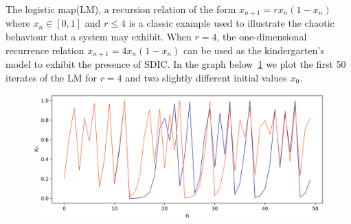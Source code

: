 \begin{Example} \rm
  The logistic map(LM), a recursion relation of the form $x_{n+1}=rx_n(1-x_n)$ where $x_n\in[0,1]$ and $r\leq{4}$ is a classic example used to illustrate the chaotic behaviour that a system may exhibit. When $r=4$, the one-dimensional recurrence relation $x_{n+1}=4x_n(1-x_n)$ can be used as the kindergarten's model to exhibit the presence of SDIC. 
  In the graph below~\ref{fig:log_sdic} we plot the first 50 iterates of the LM for $r=4$ and two slightly different initial values $x_0$.

  \begin{figure}[ht]
    \includegraphics[scale=0.74]{Graphs/_logistic_sdic.eps}
        \centering
        \label{fig:log_sdic}
      \end{figure}
\end{Example}


